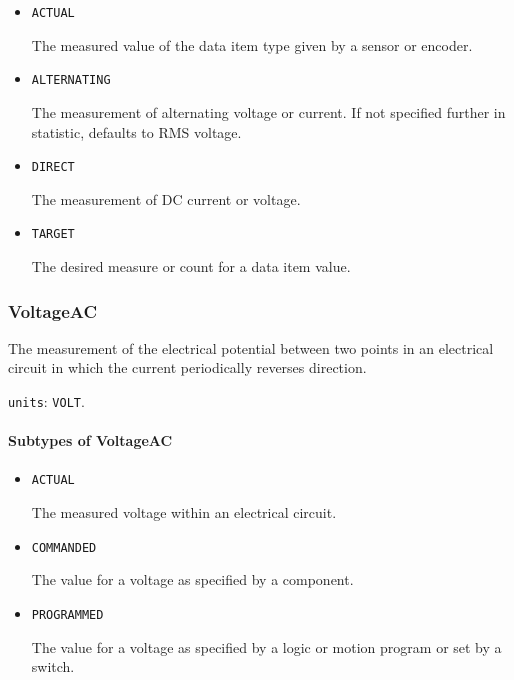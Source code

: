 \begin{itemize}

\item \texttt{ACTUAL}


The measured value of the data item type given by a sensor or encoder.

\item \texttt{ALTERNATING}


The measurement of alternating voltage or current.   If not specified further in statistic, defaults to RMS voltage. 

\item \texttt{DIRECT}


The measurement of DC current or voltage.

\item \texttt{TARGET}


The desired measure or count for a data item value.


\end{itemize}







\subsubsection{VoltageAC}
\label{sec:VoltageAC}



The measurement of the electrical potential between two points in an electrical circuit in which the current periodically reverses direction.


\texttt{units}: \texttt{VOLT}.

\paragraph{Subtypes of VoltageAC}\mbox{}
\label{sec:Subtypes of VoltageAC}

\begin{itemize}

\item \texttt{ACTUAL}


The measured voltage within an electrical circuit.

\item \texttt{COMMANDED}


The value for a voltage as specified by a  component.

\item \texttt{PROGRAMMED}


The value for a voltage as specified by a logic or motion program or set by a switch.


\end{itemize}






